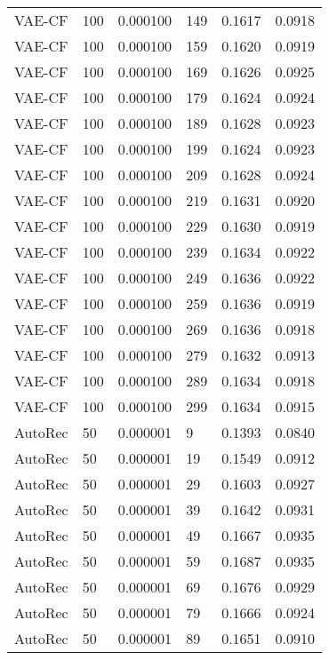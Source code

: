 \begin{tabular}{llrlrr}
  VAE-CF &  100 &  0.000100 &   149 &  0.1617 &       0.0918 \\
  VAE-CF &  100 &  0.000100 &   159 &  0.1620 &       0.0919 \\
  VAE-CF &  100 &  0.000100 &   169 &  0.1626 &       0.0925 \\
  VAE-CF &  100 &  0.000100 &   179 &  0.1624 &       0.0924 \\
  VAE-CF &  100 &  0.000100 &   189 &  0.1628 &       0.0923 \\
  VAE-CF &  100 &  0.000100 &   199 &  0.1624 &       0.0923 \\
  VAE-CF &  100 &  0.000100 &   209 &  0.1628 &       0.0924 \\
  VAE-CF &  100 &  0.000100 &   219 &  0.1631 &       0.0920 \\
  VAE-CF &  100 &  0.000100 &   229 &  0.1630 &       0.0919 \\
  VAE-CF &  100 &  0.000100 &   239 &  0.1634 &       0.0922 \\
  VAE-CF &  100 &  0.000100 &   249 &  0.1636 &       0.0922 \\
  VAE-CF &  100 &  0.000100 &   259 &  0.1636 &       0.0919 \\
  VAE-CF &  100 &  0.000100 &   269 &  0.1636 &       0.0918 \\
  VAE-CF &  100 &  0.000100 &   279 &  0.1632 &       0.0913 \\
  VAE-CF &  100 &  0.000100 &   289 &  0.1634 &       0.0918 \\
  VAE-CF &  100 &  0.000100 &   299 &  0.1634 &       0.0915 \\
 AutoRec &   50 &  0.000001 &     9 &  0.1393 &       0.0840 \\
 AutoRec &   50 &  0.000001 &    19 &  0.1549 &       0.0912 \\
 AutoRec &   50 &  0.000001 &    29 &  0.1603 &       0.0927 \\
 AutoRec &   50 &  0.000001 &    39 &  0.1642 &       0.0931 \\
 AutoRec &   50 &  0.000001 &    49 &  0.1667 &       0.0935 \\
 AutoRec &   50 &  0.000001 &    59 &  0.1687 &       0.0935 \\
 AutoRec &   50 &  0.000001 &    69 &  0.1676 &       0.0929 \\
 AutoRec &   50 &  0.000001 &    79 &  0.1666 &       0.0924 \\
 AutoRec &   50 &  0.000001 &    89 &  0.1651 &       0.0910 \\

\end{tabular}
